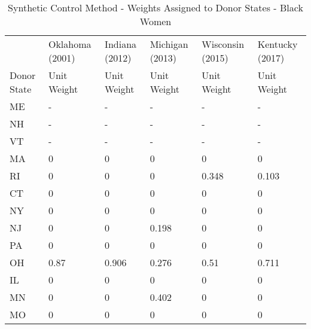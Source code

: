 \begin{table}[ht!]\centering
\caption{Synthetic Control Method - Weights Assigned to Donor States - Black Women}\label{tab:donor_weights_bf}
\fontsize{10}{11}\selectfont
\begin{tabular}{llllll}
            &                 &                &                 &                  &                 \\
            \hline\hline
            & Oklahoma (2001) & Indiana (2012) & Michigan (2013) & Wisconsin (2015) & Kentucky (2017) \\
            \hline
Donor State & Unit Weight     & Unit Weight    & Unit Weight     & Unit Weight      & Unit Weight     \\
\hline
ME          & -               & -              & -               & -                & -               \\
NH          & -               & -              & -               & -                & -               \\
VT          & -               & -              & -               & -                & -               \\
MA          & 0               & 0              & 0               & 0                & 0               \\
RI          & 0               & 0              & 0               & 0.348            & 0.103           \\
CT          & 0               & 0              & 0               & 0                & 0               \\
NY          & 0               & 0              & 0               & 0                & 0               \\
NJ          & 0               & 0              & 0.198           & 0                & 0               \\
PA          & 0               & 0              & 0               & 0                & 0               \\
OH          & 0.87            & 0.906          & 0.276           & 0.51             & 0.711           \\
IL          & 0               & 0              & 0               & 0                & 0               \\
MN          & 0               & 0              & 0.402           & 0                & 0               \\
MO          & 0               & 0              & 0               & 0                & 0               \\

\end{tabular}
\end{table}
